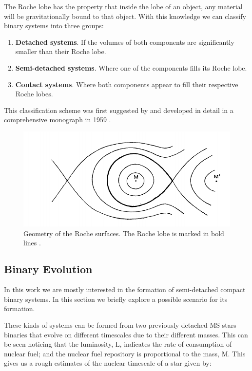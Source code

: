 The Roche lobe has the property that inside the lobe of an object, any material will be gravitationally bound to that object. With this knowledge we can classify binary systems into three groups:

\begin{enumerate}
        \item \textbf{Detached systems}. If the volumes of both components are significantly smaller than their Roche lobe. 
        \item \textbf{Semi-detached systems}. Where one of the components fills its Roche lobe.
        \item \textbf{Contact systems}. Where both components appear to fill their respective Roche lobes. 
\end{enumerate}

This classification scheme was first suggested by \citep{kopal_classification_1955} and developed in detail in a comprehensive monograph in 1959 \citep{kopal_close_1959}. 

\begin{figure}[]
        \centering
\includegraphics[scale=.3]{assets/images/kopalroche.png}
\caption{Geometry of the Roche surfaces. The Roche lobe is marked in bold lines \citep{kopal_close_1959}.}
\label{fig:roche1}
\end{figure}


\subsection{Binary Evolution}

In this work we are mostly interested in the formation of semi-detached compact binary systems. In this section we briefly explore a possible scenario for its formation. 

These kinds of systems can be formed from two previously detached MS stars binaries that evolve on different timescales due to their different masses. This can be seen noticing that the luminosity, L, indicates the rate of consumption of nuclear fuel; and the nuclear fuel repository is proportional to the mass, M. This gives us a rough estimates of the nuclear timescale of a star given by:

